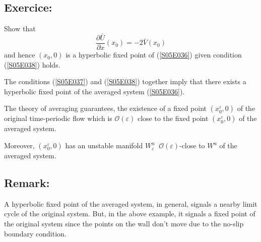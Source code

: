 \documentclass[twoside,10pt,a4paper]{article}
\begin{document}
\subsection*{Exercice:}
Show that
\begin{equation*}
	\frac{\partial \bar{U}}{\partial x}(x_0) = -2 \bar{V}(x_0)
\end{equation*}
and hence $(x_0,0)$ is a hyperbolic fixed point of (\ref{S05E036}) given condition (\ref{S05E038}) holds.

The conditions (\ref{S05E037}) and (\ref{S05E038}) together imply that there exists a hyperbolic fixed point of the averaged system (\ref{S05E036}).

The theory of averaging guarantees, the existence of a fixed point $(x_0^\varepsilon,0)$ of the original time-periodic flow which is $\mathcal{O}(\varepsilon)$ close to the fixed point $(x_0^\varepsilon,0)$ of the averaged system.

Moreover, $(x_0^\varepsilon,0)$ has an unstable manifold $W_\varepsilon^{\text{u}} \;\; \mathcal{O}(\varepsilon)$-close to $W^{\text{u}}$ of the averaged system.

\subsection*{Remark:}
A hyperbolic fixed point of the averaged system, in general, signals a nearby limit cycle of the original system. But, in the above example, it signals a fixed point of the original system since the points on the wall don't move due to the no-slip boundary condition.
\end{document}
